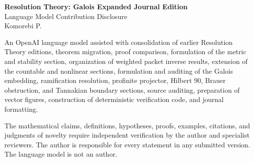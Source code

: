 \documentclass[11pt]{article}
\begin{document}
\begin{center}
{\Large\bfseries Resolution Theory: Galois Expanded Journal Edition}\\[4pt]
{\large Language Model Contribution Disclosure}\\[10pt]
Komorebi P.
\end{center}

An OpenAI language model assisted with consolidation of earlier Resolution Theory editions, theorem migration, proof comparison, formulation of the metric and stability section, organization of weighted packet inverse results, extension of the countable and nonlinear sections, formulation and auditing of the Galois embedding, ramification resolution, profinite projector, Hilbert 90, Brauer obstruction, and Tannakian boundary sections, source auditing, preparation of vector figures, construction of deterministic verification code, and journal formatting.

The mathematical claims, definitions, hypotheses, proofs, examples, citations, and judgments of novelty require independent verification by the author and specialist reviewers. The author is responsible for every statement in any submitted version. The language model is not an author.
\end{document}
